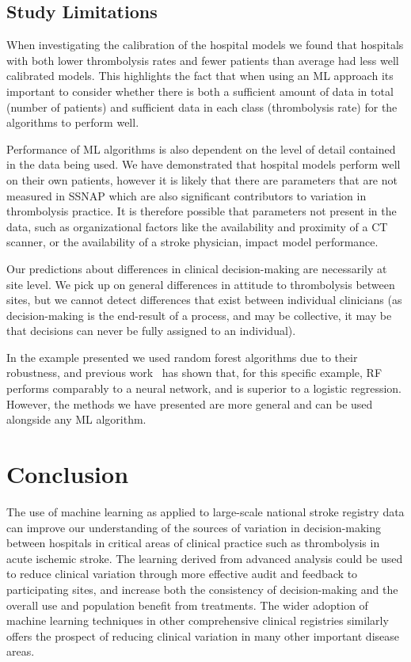 \documentclass[12pt,a4paper, pdftex]{elsarticle}
\begin{document}
\subsection{Study Limitations}

When investigating the calibration of the hospital models we found that hospitals with both lower thrombolysis rates and fewer patients than average had less well calibrated models. This highlights the fact that when using an ML approach its important to consider whether there is both a sufficient amount of data in total (number of patients) and sufficient data in each class (thrombolysis rate) for the algorithms to perform well. 

Performance of ML algorithms is also dependent on the level of detail contained in the data being used. We have demonstrated that hospital models perform well on their own patients, however it is likely that there are parameters that are not measured in SSNAP which are also significant contributors to variation in thrombolysis practice. It is therefore possible that parameters not present in the data, such as organizational factors like the availability and proximity of a CT scanner, or the availability of a stroke physician, impact model performance.

Our predictions about differences in clinical decision-making are necessarily at site level. We pick up on general differences in attitude to thrombolysis between sites, but we cannot detect differences that exist between individual clinicians (as decision-making is the end-result of a process, and may be collective, it may be that decisions can never be fully assigned to an individual).

In the example presented we used random forest algorithms due to their robustness, and previous work~\cite{samuelbook} has shown that, for this specific example, RF performs comparably to a neural network, and is superior to a logistic regression. However, the methods we have presented are more general and can be used alongside any ML algorithm. 




\section{Conclusion}

The use of machine learning as applied to large-scale national stroke registry data can improve our understanding of the sources of variation in decision-making between hospitals in critical areas of clinical practice such as thrombolysis in acute ischemic stroke. The learning derived from advanced analysis could be used to reduce clinical variation through more effective audit and feedback to participating sites, and increase both the consistency of decision-making and the overall use and population benefit from treatments. The wider adoption of machine learning techniques in other comprehensive clinical registries similarly offers the prospect of reducing clinical variation in many other important disease areas.
\end{document}
